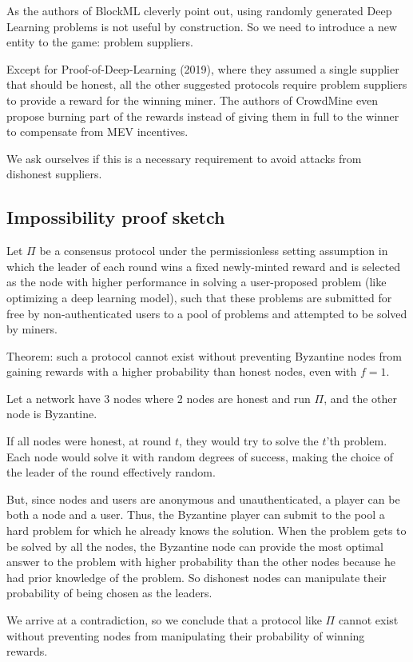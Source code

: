 \documentclass[conference]{IEEEtran}
\begin{document}
As the authors of BlockML cleverly point out, using randomly generated Deep Learning problems is not useful by construction. So we need to introduce a new entity to the game: problem suppliers.

Except for Proof-of-Deep-Learning (2019), where they assumed a single supplier that should be honest, all the other suggested protocols require problem suppliers to provide a reward for the winning miner. The authors of CrowdMine even propose burning part of the rewards instead of giving them in full to the winner to compensate from MEV incentives.

We ask ourselves if this is a necessary requirement to avoid attacks from dishonest suppliers.

\subsection{Impossibility proof sketch}

Let $\Pi$ be a consensus protocol under the permissionless setting assumption in which the leader of each round wins a fixed newly-minted reward and is selected as the node with higher performance in solving a user-proposed problem (like optimizing a deep learning model), such that these problems are submitted for free by non-authenticated users to a pool of problems and attempted to be solved by miners.

Theorem: such a protocol cannot exist without preventing Byzantine nodes from gaining rewards with a higher probability than honest nodes, even with $f=1$.

Let a network have 3 nodes where 2 nodes are honest and run $\Pi$, and the other node is Byzantine.

If all nodes were honest, at round $t$, they would try to solve the $t$'th problem. Each node would solve it with random degrees of success, making the choice of the leader of the round effectively random.

But, since nodes and users are anonymous and unauthenticated, a player can be both a node and a user. Thus, the Byzantine player can submit to the pool a hard problem for which he already knows the solution. When the problem gets to be solved by all the nodes, the Byzantine node can provide the most optimal answer to the problem with higher probability than the other nodes because he had prior knowledge of the problem. So dishonest nodes can manipulate their probability of being chosen as the leaders.

We arrive at a contradiction, so we conclude that a protocol like $\Pi$ cannot exist without preventing nodes from manipulating their probability of winning rewards. 
\end{document}
